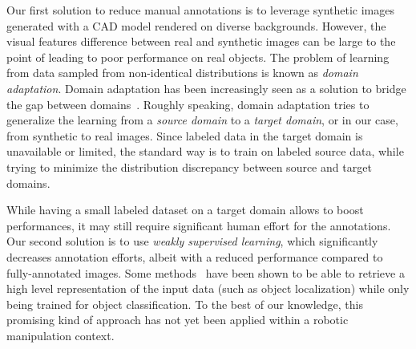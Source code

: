 \documentclass[letterpaper, 10 pt, conference]{ieeeconf}  %
\newcommand{\jp}[1]{\textcolor{orange}{#1}}
\begin{document}
Our first solution to reduce manual annotations is to leverage synthetic images generated with a CAD model rendered on diverse backgrounds. However, the visual features difference between real and synthetic images can be large to the point of leading to poor performance on real objects. The problem of learning from data sampled from non-identical distributions is known as {\it domain adaptation}. Domain adaptation has been increasingly seen as a solution to bridge the gap between domains~\cite{wang2018deep,csurka2017domain}. Roughly speaking, domain adaptation tries to generalize the learning from a \textit{source domain} to a \textit{target domain}, or in our case, from synthetic to real images. Since labeled data in the target domain is unavailable or limited, the standard way %
is to train on labeled source data, while trying to minimize the distribution discrepancy between source and target domains. %

While having a small labeled dataset on a target domain allows to boost performances, it may still require significant human effort for the annotations. Our second solution is to use {\it weakly supervised learning}, which significantly decreases annotation efforts, albeit with a reduced performance compared to fully-annotated images. Some methods~\cite{oquab2015object,durand2017wildcat} have been shown to be able to retrieve a high level representation of the input data (such as object localization) while only being trained for object classification. To the best of our knowledge, this promising kind of approach has not yet been applied within a robotic manipulation context.
\end{document}
